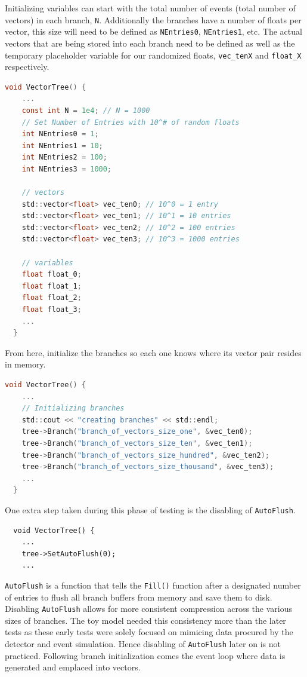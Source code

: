 Initializing variables can start with the total number of events (total number of vectors) in each branch, \verb|N|. 
Additionally the branches have a number of floats per vector, this size will need to be defined as \verb|NEntries0|, \verb|NEntries1|, etc.  
The actual vectors that are being stored into each branch need to be defined as well as the temporary placeholder variable for our randomized floats, \verb|vec_tenX| and \verb|float_X| respectively. 
\begin{lstlisting}[language=C]  
  void VectorTree() {
    ...
    const int N = 1e4; // N = 1000
    // Set Number of Entries with 10^# of random floats
    int NEntries0 = 1;
    int NEntries1 = 10;
    int NEntries2 = 100;
    int NEntries3 = 1000;

    // vectors
    std::vector<float> vec_ten0; // 10^0 = 1 entry
    std::vector<float> vec_ten1; // 10^1 = 10 entries
    std::vector<float> vec_ten2; // 10^2 = 100 entries
    std::vector<float> vec_ten3; // 10^3 = 1000 entries

    // variables
    float float_0;
    float float_1;
    float float_2;
    float float_3;
    ...
  }
\end{lstlisting}

From here, initialize the branches so each one knows where its vector pair resides in memory.
\begin{lstlisting}[language=C]  
  void VectorTree() {
    ...
    // Initializing branches
    std::cout << "creating branches" << std::endl;
    tree->Branch("branch_of_vectors_size_one", &vec_ten0);
    tree->Branch("branch_of_vectors_size_ten", &vec_ten1);
    tree->Branch("branch_of_vectors_size_hundred", &vec_ten2);
    tree->Branch("branch_of_vectors_size_thousand", &vec_ten3);
    ...
  }
\end{lstlisting}
One extra step taken during this phase of testing is the disabling of \verb|AutoFlush|. 
\begin{lstlisting}
  void VectorTree() {
    ...
    tree->SetAutoFlush(0);
    ...
\end{lstlisting}
\verb|AutoFlush| is a function that tells the \verb|Fill()| function after a designated number of entries to flush all branch buffers from memory and save them to disk. 
Disabling \verb|AutoFlush| allows for more consistent compression across the various sizes of branches. 
The toy model needed this consistency more than the later tests as these early tests were solely focused on mimicing data procured by the detector and event simulation. 
Hence disabling of \verb|AutoFlush| later on is not practiced. 
Following branch initialization comes the event loop where data is generated and emplaced into vectors.

